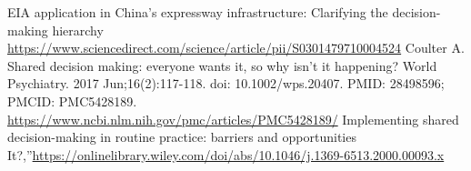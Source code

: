 \documentclass[runningheads]{llncs}
\begin{document}
%
%
%

\begin{thebibliography}{8}
    EIA application in China’s expressway infrastructure: Clarifying the decision-making hierarchy \url{https://www.sciencedirect.com/science/article/pii/S0301479710004524}
    Coulter A. Shared decision making: everyone wants it, so why isn't it happening? World Psychiatry. 2017 Jun;16(2):117-118. doi: 10.1002/wps.20407. PMID: 28498596; PMCID: PMC5428189. \url{https://www.ncbi.nlm.nih.gov/pmc/articles/PMC5428189/} 
    Implementing shared decision-making in routine practice: barriers and opportunities It?,”\url{https://onlinelibrary.wiley.com/doi/abs/10.1046/j.1369-6513.2000.00093.x}
    
\end{thebibliography}
\end{document}

